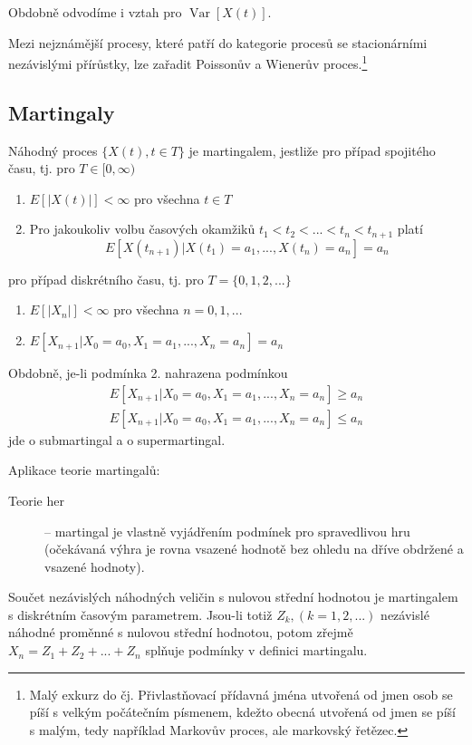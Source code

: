 \documentclass[10pt]{article}
\DeclareMathOperator*{\var}{Var}
\begin{document}
Obdobně odvodíme i vztah pro $\var[X(t)]$.

Mezi nejznámější procesy, které patří do kategorie procesů se stacionárními nezávislými přírůstky, lze zařadit Poissonův a Wienerův proces.\footnote{Malý exkurz do čj. Přivlastňovací přídavná jména utvořená od jmen osob se píší s velkým počátečním písmenem, kdežto obecná utvořená od jmen se píší s malým, tedy například Markovův proces, ale markovský řetězec.}

\subsection{Martingaly}
Náhodný proces $\{X(t),t \in T\}$ je martingalem, jestliže pro případ spojitého času, tj. pro $T\in [0,\infty)$
\begin{enumerate}
\item $E[|X(t)|]<\infty$ pro všechna $t \in T$
\item Pro jakoukoliv volbu časových okamžiků $t_1<t_2<...<t_n<t_{n+1}$ platí
\begin{equation}
E[X(t_{n+1})|X(t_1)=a_1,...,X(t_n)=a_n] = a_n
\end{equation}
\end{enumerate}
pro případ diskrétního času, tj. pro $T = \{0,1,2,...\}$
\begin{enumerate}
\item $E[|X_n|]<\infty$ pro všechna $n=0,1,...$
\item $E[X_{n+1}|X_0=a_0,X_1=a_1,...,X_n=a_n] = a_n$
\end{enumerate}

Obdobně, je-li podmínka 2. nahrazena podmínkou
\begin{gather}
E[X_{n+1}|X_0=a_0,X_1=a_1,...,X_n=a_n] \geq a_n\\
E[X_{n+1}|X_0=a_0,X_1=a_1,...,X_n=a_n] \leq a_n
\end{gather} jde o submartingal a o supermartingal.

Aplikace teorie martingalů:
\begin{description}
\item [Teorie her] -- martingal je vlastně vyjádřením podmínek pro spravedlivou hru (očekávaná výhra je rovna vsazené hodnotě bez ohledu na dříve obdržené a vsazené hodnoty).
\end{description}

Součet nezávislých náhodných veličin s nulovou střední hodnotou je martingalem s diskrétním časovým parametrem. Jsou-li totiž $Z_k, (k=1,2,...)$ nezávislé náhodné proměnné s nulovou střední hodnotou, potom zřejmě $X_n = Z_1 + Z_2 + ... + Z_n$ splňuje podmínky v definici martingalu.
\end{document}
